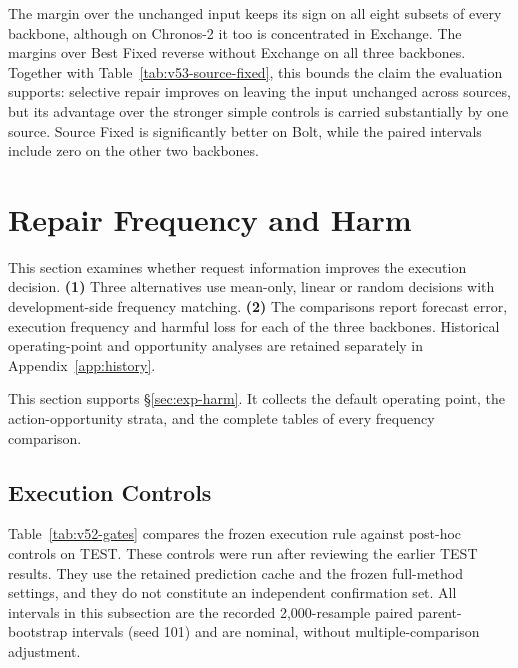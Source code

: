 \documentclass{article}
\begin{document}
The margin over the unchanged input keeps its sign on all eight subsets of every backbone,
although on Chronos-2 it too is concentrated in Exchange. The margins over Best Fixed
reverse without Exchange on all three backbones. Together with
Table~\ref{tab:v53-source-fixed}, this bounds the claim the evaluation supports: selective
repair improves on leaving the input unchanged across sources, but its advantage over the
stronger simple controls is carried substantially by one source. Source Fixed is significantly
better on Bolt, while the paired intervals include zero on the other two backbones.

\section{Repair Frequency and Harm}

This section examines whether request information improves the execution decision. \textbf{(1)} Three alternatives use mean-only, linear or random decisions with development-side frequency matching. \textbf{(2)} The comparisons report forecast error, execution frequency and harmful loss for each of the three backbones. Historical operating-point and opportunity analyses are retained separately in Appendix~\ref{app:history}.

This section supports \S\ref{sec:exp-harm}. It collects the default operating point, the
action-opportunity strata, and the complete tables of every frequency comparison.

\subsection{Execution Controls}
\label{app:gate-controls}
Table~\ref{tab:v52-gates} compares the frozen execution rule against post-hoc controls on TEST.
These controls were run after reviewing the earlier TEST results. They use the retained
prediction cache and the frozen full-method settings, and they do not constitute an
independent confirmation set. All intervals in this subsection are the recorded
2,000-resample paired parent-bootstrap intervals (seed 101) and are nominal, without
multiple-comparison adjustment.
\end{document}
